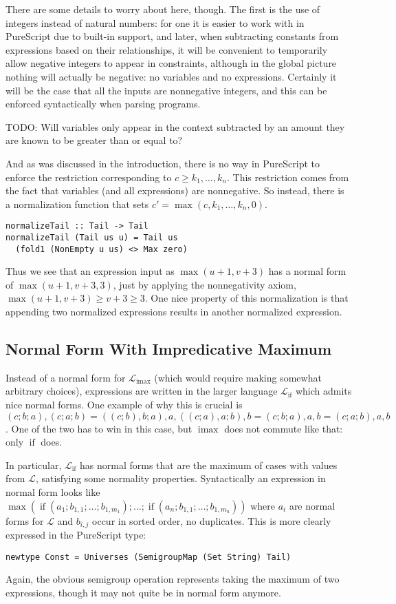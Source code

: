 \documentclass[11pt, twoside, reqno]{book}
\DeclareMathOperator{\imax}{imax}
\DeclareMathOperator{\ifop}{if}
\begin{document}
There are some details to worry about here, though.
The first is the use of integers instead of natural numbers:
for one it is easier to work with in PureScript due to built-in support,
and later, when subtracting constants from expressions based on their relationships,
it will be convenient to temporarily allow negative integers to appear in constraints, although in the global picture nothing will actually be negative: no variables and no expressions.
Certainly it will be the case that all the inputs are nonnegative integers, and this can be enforced syntactically when parsing programs.

TODO: Will variables only appear in the context subtracted by an amount they are known to be greater than or equal to?

And as was discussed in the introduction, there is no way in PureScript to enforce the restriction corresponding to \(c \ge k_1, \dots, k_n\).
This restriction comes from the fact that variables (and all expressions) are nonnegative.
So instead, there is a normalization function that sets \(c\prime = \max(c, k_1, \dots, k_n, 0)\).
\begin{verbatim}
normalizeTail :: Tail -> Tail
normalizeTail (Tail us u) = Tail us
  (fold1 (NonEmpty u us) <> Max zero)
\end{verbatim}
Thus we see that an expression input as \(\max(u+1, v+3)\) has a normal form of \(\max(u+1, v+3, 3)\), just by applying the nonnegativity axiom, \(\max(u+1, v+3) \ge v+3 \ge 3\).
One nice property of this normalization is that appending two normalized expressions results in another normalized expression.

\subsection{Normal Form With Impredicative Maximum}

Instead of a normal form for \(\mathcal{L}_{\imax}\) (which would require making somewhat arbitrary choices), expressions are written in the larger language \(\mathcal{L}_{\ifop}\) which admits nice normal forms.
One example of why this is crucial is \((c; b; a), (c; a; b) = ((c; b), b; a), a, ((c; a), a; b), b = (c; b; a), a, b = (c; a; b), a, b\).
One of the two has to win in this case, but \(\imax\) does not commute like that: only \(\ifop\) does.

In particular, \(\mathcal{L}_{\ifop}\) has normal forms that are the maximum of cases with values from \(\mathcal{L}\), satisfying some normality properties.
Syntactically an expression in normal form looks like\\ \(\max(\ifop(a_1; b_{1,1}; \dots; b_{1,m_1}); \dots; \ifop(a_n; b_{1,1}; \dots; b_{1,m_n}))\) where \(a_i\) are normal forms for \(\mathcal{L}\) and \(b_{i,j}\) occur in sorted order, no duplicates.
This is more clearly expressed in the PureScript type:
\begin{verbatim}
newtype Const = Universes (SemigroupMap (Set String) Tail)
\end{verbatim}
Again, the obvious semigroup operation represents taking the maximum of two expressions, though it may not quite be in normal form anymore.
\end{document}
